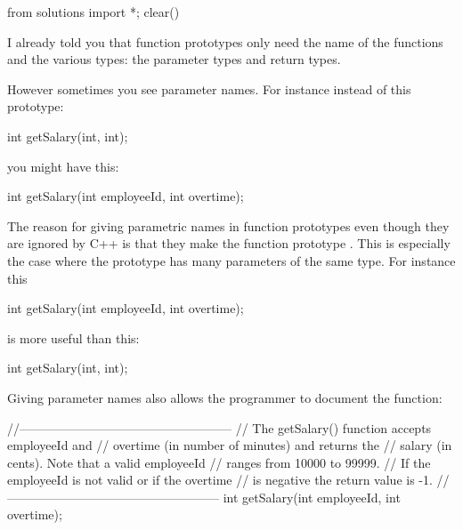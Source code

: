\begin{python0}
from solutions import *; clear()
\end{python0}

I already told you that function prototypes only need the name of the
functions and the various types: the parameter types and return types.

However sometimes you see parameter names. For instance instead of this
prototype:

\begin{consolethree}[escapeinside=||]
int getSalary(int, int);
\end{consolethree}

you might have this:

\begin{consolethree}[escapeinside=||]
int getSalary(int employeeId, int overtime);
\end{consolethree}

The reason for giving parametric names in function prototypes even
though they are ignored by C++ is that they make the function prototype
. This is especially the case where the
prototype has many parameters of the same type. For instance this

\begin{consolethree}[escapeinside=||]
int getSalary(int employeeId, int overtime);
\end{consolethree}

is more useful than this:

\begin{consolethree}[escapeinside=||]
int getSalary(int, int);
\end{consolethree}

Giving parameter names also allows the programmer to document the
function:

\begin{consolethree}[escapeinside=||]
//---------------------------------------------------
// The getSalary() function accepts employeeId and
// overtime (in number of minutes) and returns the
// salary (in cents). Note that a valid employeeId
// ranges from 10000 to 99999.
// If the employeeId is not valid or if the overtime
// is negative the return value is -1.
//---------------------------------------------------
int getSalary(int employeeId, int overtime);
\end{consolethree}

